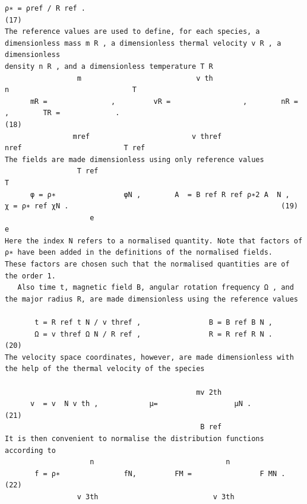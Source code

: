 \documentclass[a4paper]{article}
\newcommand{\gkwpagefont}{\fontsize{6.0pt}{7.55pt}\selectfont}
\begin{document}
\begin{Verbatim}[fontsize=\gkwpagefont]
      ρ∗ = ρref / R ref .                                                                                                                                (17)
The reference values are used to define, for each species, a dimensionless mass m R , a dimensionless thermal velocity v R , a dimensionless
density n R , and a dimensionless temperature T R
                 m                           v th                           n                             T
      mR =               ,         vR =                 ,        nR =               ,        TR =             .                                          (18)
                mref                        v thref                       nref                        T ref
The fields are made dimensionless using only reference values
                 T ref                                                                            T
      φ = ρ∗                φN ,        A  = B ref R ref ρ∗2 A  N ,                   χ = ρ∗ ref χN .                                                  (19)
                    e                                                                                 e
Here the index N refers to a normalised quantity. Note that factors of ρ∗ have been added in the definitions of the normalised fields.
These factors are chosen such that the normalised quantities are of the order 1.
   Also time t, magnetic field B, angular rotation frequency Ω , and the major radius R, are made dimensionless using the reference values

       t = R ref t N / v thref ,                B = B ref B N ,
       Ω = v thref Ω N / R ref ,                R = R ref R N .                                                                                          (20)
The velocity space coordinates, however, are made dimensionless with the help of the thermal velocity of the species

                                             mv 2th
      v  = v  N v th ,            μ=                  μN .                                                                                             (21)
                                              B ref
It is then convenient to normalise the distribution functions according to
                    n                               n
       f = ρ∗               fN,         FM =                F MN .                                                                                       (22)
                 v 3th                           v 3th
\end{Verbatim}
\newpage
\end{document}
